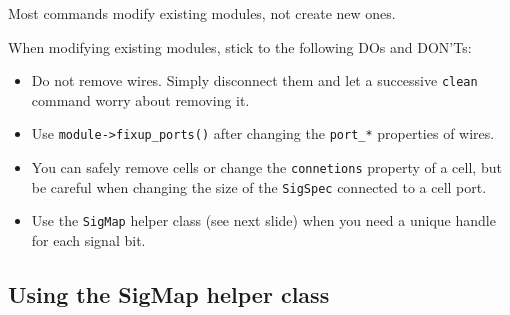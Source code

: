 \begin{frame}{\subsecname}
Most commands modify existing modules, not create new ones.

When modifying existing modules, stick to the following DOs and DON'Ts:

\begin{itemize}
\item Do not remove wires. Simply disconnect them and let a successive {\tt clean} command worry about removing it.

\item Use {\tt module->fixup\_ports()} after changing the {\tt port\_*} properties of wires.

\item You can safely remove cells or change the {\tt connetions} property of a cell, but be careful when
changing the size of the {\tt SigSpec} connected to a cell port.

\item Use the {\tt SigMap} helper class (see next slide) when you need a unique handle for each signal bit.
\end{itemize}
\end{frame}


\subsection{Using the SigMap helper class}

